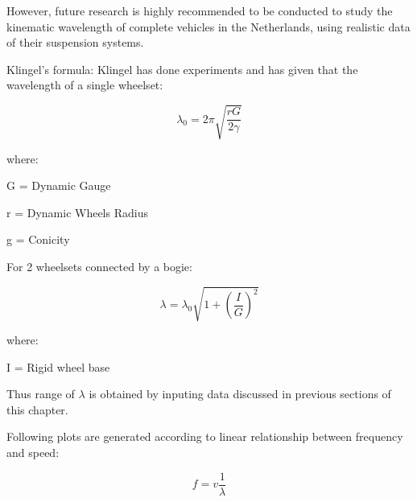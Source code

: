 However, future research is highly recommended to be conducted to study the kinematic wavelength of complete vehicles in the Netherlands, using realistic data of their suspension systems.

Klingel's formula:
Klingel has done experiments and has given that the wavelength of a single wheelset:

$$ \lambda_0 = 2 \pi \sqrt{\frac{rG}{2\gamma} }$$

where:

G = Dynamic Gauge

r = Dynamic Wheels Radius

g = Conicity

For 2 wheelsets connected by a bogie:

$$ \lambda = \lambda_0 \sqrt{1+(\frac{I}{G})^2}  $$

where:

I = Rigid wheel base

Thus range of $\lambda$ is obtained by inputing data discussed in previous sections of this chapter.

Following plots are generated according to linear relationship between frequency and speed:

$$ f = v \frac{1}{\lambda} $$


\begin{figure}[h!]
\centering
{}
\end{figure}

